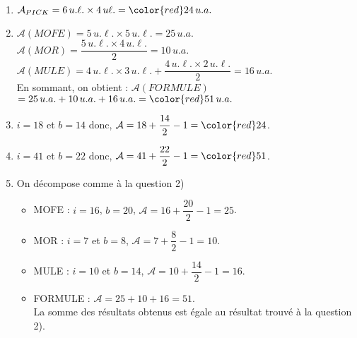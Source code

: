 \begin{corrige}
   \begin{enumerate}
      \item $\mathcal{A}_{PICK} =6\,u.\ell.\times4\,u\ell. ={\color{red} 24\,u.a.}$
      \item $\mathcal{A}(MOFE) =5\,u.\ell.\times5\,u.\ell. =25\,u.a.$ \\ [1mm] 
         $\mathcal{A}(MOR) =\dfrac{5\,u.\ell.\times4\,u.\ell.}{2} =10\,u.a.$ \\ [1mm]
         $\mathcal{A}(MULE) =4\,u.\ell.\times3\,u.\ell.+\dfrac{4\,u.\ell.\times2\,u.\ell.}{2} =16\,u.a.$ \\ [1mm]
         En sommant, on obtient : $\mathcal{A}(FORMULE)$ \\
         $=25\,u.a.+10\,u.a.+16\,u.a. ={\color{red} 51\,u.a.}$ \smallskip
      \item {\color{red} $i =18$} et {\color{red} $b =14$} donc, $\mathcal{A} =18+\dfrac{14}{2}-1 ={\color{red} 24}$. \smallskip
      \item {\color{red} $i =41$} et {\color{red} $b =22$} donc, $\mathcal{A} =41+\dfrac{22}{2}-1 ={\color{red} 51}$. \smallskip
      \item On décompose comme à la question 2)
         \begin{itemize}
            \item MOFE : $i =16$, $b =20$, $\mathcal{A} =16+\dfrac{20}{2}-1 =25$. \smallskip
            \item MOR : $i =7$ et $b =8$, $\mathcal{A} =7+\dfrac{8}{2}-1 =10$. \smallskip
            \item MULE : $i =10$ et $b =14$, $\mathcal{A} =10+\dfrac{14}{2}-1 =16$. \smallskip
            \item FORMULE : $\mathcal{A} =25+10+16 =51$. \\
         {\color{red} La somme des résultats obtenus est égale au résultat trouvé à la question 2).}
      \end{itemize}
   \end{enumerate}
\end{corrige}


   

